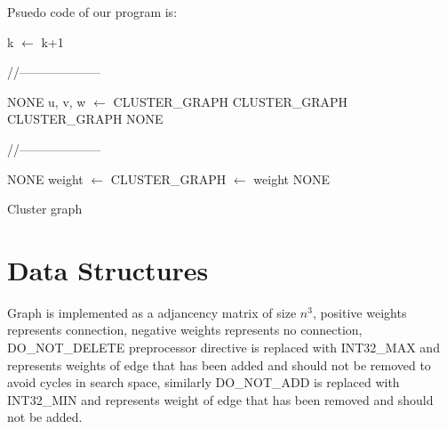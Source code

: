 \documentclass[5p,twocolumn,final]{elsarticle}
\begin{document}
Psuedo code of our program is:
\begin{algorithm}[H]
	\begin{algorithmic}	[1]
		    \State k $\gets$ k+1 \EndWhile
		\EndFunction
	\end{algorithmic}	
	//--------------------
	\begin{algorithmic}	[1]
    				\Return NONE
				\EndIf
				\State \State u, v, w $\gets$  
				\State {}
    				\Return \textup{CLUSTER\_GRAPH}
				\EndIf
    				\Return \textup{CLUSTER\_GRAPH}
				\EndIf
    				\Return \textup{CLUSTER\_GRAPH}
				\EndIf
				\State \State\Return NONE												
		\EndFunction
	\end{algorithmic}	
	//--------------------
	\begin{algorithmic}	[1]
				\Return NONE
			\EndIf
			\State\State weight $\gets$ 
			\State{}
				\State {}
			\EndIf
				\State {}
			\EndIf
			\State{}
	    				\Return CLUSTER\_GRAPH
			\EndIf
			\State\State {} $\gets$ weight			\quad\quad {}
			\State\State\Return NONE													
		\EndFunction
	\end{algorithmic}

 \caption{Cluster graph}
\end{algorithm}

\section{Data Structures}
Graph is implemented as a adjancency matrix of size $n^3$, positive weights represents connection, negative weights represents no connection, DO\_NOT\_DELETE preprocessor directive is replaced with INT32\_MAX and represents weights of edge that has been added and should not be removed to avoid cycles in search space, similarly DO\_NOT\_ADD is replaced with INT32\_MIN and represents weight of edge that has been removed and should not be added.
\end{document}
